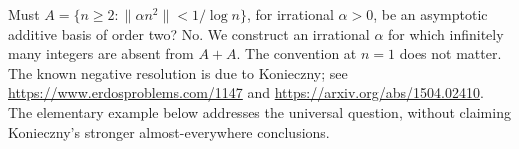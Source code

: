 Must \(A=\{n\geq2:\|\alpha n^2\|<1/\log n\}\), for irrational \(\alpha>0\), be an asymptotic additive basis of order two?
No. We construct an irrational \(\alpha\) for which infinitely many integers are absent from \(A+A\). The convention at \(n=1\) does not matter. The known negative resolution is due to Konieczny; see \url{https://www.erdosproblems.com/1147} and \url{https://arxiv.org/abs/1504.02410}. The elementary example below addresses the universal question, without claiming Konieczny's stronger almost-everywhere conclusions.
